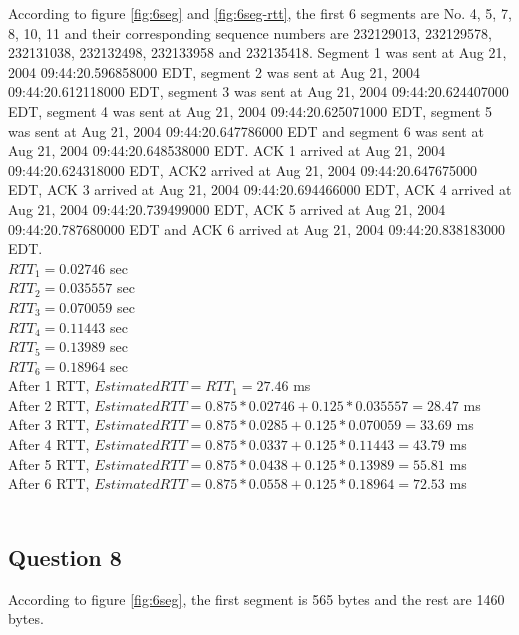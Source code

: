 \documentclass[titlepage, paper=a4, fontsize=11pt]{scrartcl} %
\numberwithin{equation}{section} %
\numberwithin{figure}{section} %
\numberwithin{table}{section} %
\begin{document}
According to figure \ref{fig:6seg} and \ref{fig:6seg-rtt}, the first 6 segments are No. 4, 5, 7, 8, 10, 11 and their corresponding sequence numbers are 232129013, 232129578, 232131038, 232132498, 232133958 and 232135418. Segment 1 was sent at Aug 21, 2004 09:44:20.596858000 EDT, segment 2 was sent at Aug 21, 2004 09:44:20.612118000 EDT, segment 3 was sent at Aug 21, 2004 09:44:20.624407000 EDT, segment 4 was sent at Aug 21, 2004 09:44:20.625071000 EDT, segment 5 was sent at Aug 21, 2004 09:44:20.647786000 EDT and segment 6 was sent at Aug 21, 2004 09:44:20.648538000 EDT. ACK 1 arrived at Aug 21, 2004 09:44:20.624318000 EDT, ACK2 arrived at Aug 21, 2004 09:44:20.647675000 EDT, ACK 3 arrived at Aug 21, 2004 09:44:20.694466000 EDT, ACK 4 arrived at Aug 21, 2004 09:44:20.739499000 EDT, ACK 5 arrived at Aug 21, 2004 09:44:20.787680000 EDT and ACK 6 arrived at Aug 21, 2004 09:44:20.838183000 EDT. \\
$RTT_1 = 0.02746$ sec \\
$RTT_2 = 0.035557$ sec \\
$RTT_3 = 0.070059$ sec \\
$RTT_4 = 0.11443$ sec \\
$RTT_5 = 0.13989$ sec \\
$RTT_6 = 0.18964$ sec \\
After 1 RTT, $EstimatedRTT = RTT_1 = 27.46$ ms \\
After 2 RTT, $EstimatedRTT =  0.875 * 0.02746 + 0.125 * 0.035557 = 28.47$ ms \\
After 3 RTT, $EstimatedRTT =  0.875 * 0.0285 + 0.125 * 0.070059 = 33.69$ ms \\
After 4 RTT, $EstimatedRTT =  0.875 * 0.0337+ 0.125 * 0.11443 = 43.79$ ms \\
After 5 RTT, $EstimatedRTT =  0.875 * 0.0438 + 0.125 * 0.13989 = 55.81$ ms \\
After 6 RTT, $EstimatedRTT =  0.875 * 0.0558 + 0.125 * 0.18964 = 72.53$ ms \\
 \\

\subsection*{Question 8}
According to figure \ref{fig:6seg}, the first segment is 565 bytes and the rest are 1460 bytes. \\
\end{document}
